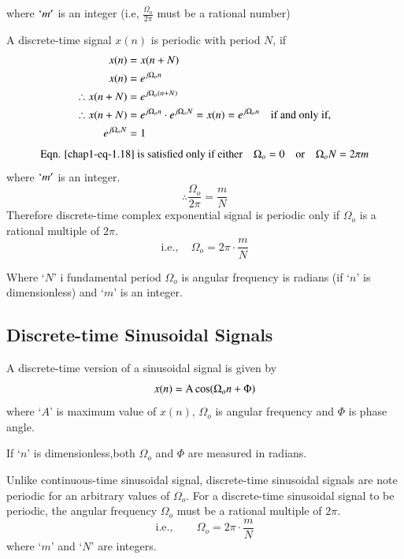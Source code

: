 where $`m'$  is an integer (i.e, $\frac{\Omega_{o}}{2\pi}$ must be a rational number)

A discrete-time signal $x(n)$ is periodic with period $N$, if
\begin{align}
x(n) &= x(n + N)\notag\\
x(n) &= e^{j \Omega_{o}n}\notag\\
\therefore x(n + N)&= e^{j \Omega_{o}(n + N)}\label{chap1-eq-1.17}\\ 
\therefore x(n + N)&= e^{j \Omega_{o}n} \cdot e^{j \Omega_{o} N}=x(n)= e^{j \Omega_{o}n} \quad \text{if and only if},\notag\\
e^{j \Omega_{o} N} &= 1\label{chap1-eq-1.18}
\end{align}
\begin{equation}
\text{Eqn. \ref{chap1-eq-1.18} is satisfied  only if either} \quad \Omega_{o} = 0\quad \text{or} \quad
\Omega_{o}N= 2\pi m\label{chap1-eq-1.19}
\end{equation}
where $`m'$ is an integer.
\begin{equation}
\therefore \dfrac{\Omega_{o}}{2 \pi}  = \dfrac{m}{N}\label{chap1-eq-1.20}
\end{equation}
Therefore discrete-time complex exponential signal is periodic only if $\Omega_{o}$ is a rational multiple of $2\pi$.
\begin{equation}
\text{i.e.},  \quad \Omega_{o} = 2\pi \cdot \dfrac{m}{N}\label{chap1-eq-1.21}
\end{equation}

Where `$N$' i fundamental period $\Omega_{o}$ is angular frequency is radians (if `$n$' is  dimensionless) and `$m$' is an integer.

\subsection{Discrete-time Sinusoidal Signals}\label{chap1-subsec-1.4.2}

A discrete-time version of a sinusoidal signal is given by
\begin{equation}
x(n) = \textrm{A} \cos (\Omega_{o}n + \Phi)\label{chap1-eq-1.22}
\end{equation}
where `$A$' is maximum value of $x(n)$, $\Omega_{o}$ is angular frequency and $\Phi$ is phase angle.

If `$n$' is dimensionless,both $\Omega_{o}$ and $\Phi$ are measured in radians.

Unlike continuous-time sinusoidal signal, discrete-time sinusoidal signals are note periodic for an arbitrary values of $\Omega_{o}$. For a discrete-time sinusoidal signal to be periodic, the angular frequency $\Omega_{o}$ must be a rational multiple of $2 \pi$.
\begin{equation}
\text{i.e.}, \qquad \Omega_{o} = 2 \pi\cdot \dfrac{m}{N}\label{chap1-eq-1.23}
\end{equation}
where `$m$' and `$N$' are integers.

